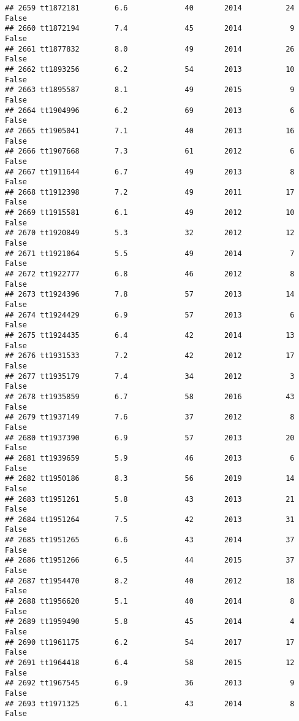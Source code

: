 \documentclass[
]{article}
\begin{document}
\begin{verbatim}
## 2659 tt1872181        6.6             40       2014          24   False
## 2660 tt1872194        7.4             45       2014           9   False
## 2661 tt1877832        8.0             49       2014          26   False
## 2662 tt1893256        6.2             54       2013          10   False
## 2663 tt1895587        8.1             49       2015           9   False
## 2664 tt1904996        6.2             69       2013           6   False
## 2665 tt1905041        7.1             40       2013          16   False
## 2666 tt1907668        7.3             61       2012           6   False
## 2667 tt1911644        6.7             49       2013           8   False
## 2668 tt1912398        7.2             49       2011          17   False
## 2669 tt1915581        6.1             49       2012          10   False
## 2670 tt1920849        5.3             32       2012          12   False
## 2671 tt1921064        5.5             49       2014           7   False
## 2672 tt1922777        6.8             46       2012           8   False
## 2673 tt1924396        7.8             57       2013          14   False
## 2674 tt1924429        6.9             57       2013           6   False
## 2675 tt1924435        6.4             42       2014          13   False
## 2676 tt1931533        7.2             42       2012          17   False
## 2677 tt1935179        7.4             34       2012           3   False
## 2678 tt1935859        6.7             58       2016          43   False
## 2679 tt1937149        7.6             37       2012           8   False
## 2680 tt1937390        6.9             57       2013          20   False
## 2681 tt1939659        5.9             46       2013           6   False
## 2682 tt1950186        8.3             56       2019          14   False
## 2683 tt1951261        5.8             43       2013          21   False
## 2684 tt1951264        7.5             42       2013          31   False
## 2685 tt1951265        6.6             43       2014          37   False
## 2686 tt1951266        6.5             44       2015          37   False
## 2687 tt1954470        8.2             40       2012          18   False
## 2688 tt1956620        5.1             40       2014           8   False
## 2689 tt1959490        5.8             45       2014           4   False
## 2690 tt1961175        6.2             54       2017          17   False
## 2691 tt1964418        6.4             58       2015          12   False
## 2692 tt1967545        6.9             36       2013           9   False
## 2693 tt1971325        6.1             43       2014           8   False

\end{verbatim}
\end{document}
